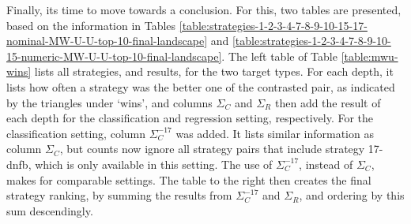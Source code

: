 \documentclass[smallextended]{svjour3}
\newcommand{\dnfb}[1]{17-dnfb} %
\begin{document}
Finally, its time to move towards a conclusion.
For this, two tables are presented, based on the information in Tables \ref{table:strategies-1-2-3-4-7-8-9-10-15-17-nominal-MW-U-U-top-10-final-landscape} and \ref{table:strategies-1-2-3-4-7-8-9-10-15-numeric-MW-U-U-top-10-final-landscape}.
The left table of Table \ref{table:mwu-wins} lists all strategies, and results, for the two target types.
For each depth, it lists how often a strategy was the better one of the contrasted pair, as indicated by the triangles under `wins', and columns $\Sigma_{C}$ and $\Sigma_{R}$ then add the result of each depth for the classification and regression setting, respectively.
For the classification setting, column $\Sigma_{C}^{-17}$ was added.
It lists similar information as column $\Sigma_{C}$, but counts now ignore all strategy pairs that include strategy \dnfb{0}, which is only available in this setting.
The use of $\Sigma_{C}^{-17}$, instead of $\Sigma_{C}$, makes for comparable settings.
The table to the right then creates the final strategy ranking, by summing the results from $\Sigma_{C}^{-17}$ and $\Sigma_{R}$, and ordering by this sum descendingly.
\end{document}
